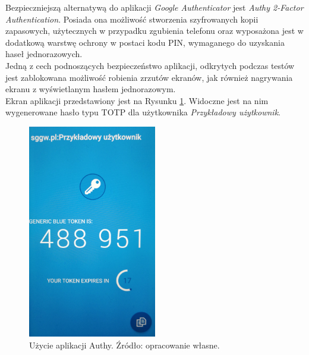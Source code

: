 Bezpieczniejszą alternatywą do aplikacji \textit{Google Authenticator} jest \textit{Authy 2-Factor Authentication}. 
Posiada ona możliwość stworzenia szyfrowanych kopii zapasowych, użytecznych w przypadku zgubienia telefonu oraz
wyposażona jest w dodatkową warstwę ochrony w postaci kodu PIN, wymaganego do uzyskania haseł jednorazowych. \\
Jedną z cech podnoszących bezpieczeństwo aplikacji, odkrytych podczas testów jest zablokowana możliwość 
robienia zrzutów ekranów, jak również nagrywania ekranu z wyświetlanym hasłem jednorazowym. \\
Ekran aplikacji przedstawiony jest na Rysunku \ref{mobile-authy}. 
Widoczne jest na nim wygenerowane hasło typu TOTP dla użytkownika \textit{Przykładowy użytkownik}.
\begin{figure}[t]
    \centering
	\includegraphics[width=0.5\textwidth]{content/images/mobile-authy}
	\caption{Użycie aplikacji Authy. Źródło: opracowanie własne.}
    \label{mobile-authy}
\end{figure}

